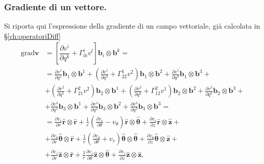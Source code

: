 \subsubsection{Gradiente di un vettore.}
Si riporta qui l'espressione della gradiente di un campo vettoriale, già calcolata in \S\ref{ch:operatoriDiff}
\begin{equation}
\begin{aligned}
    \text{grad} \bm{v} & = \left[ \dfrac{\partial v^i}{\partial q^k} + \Gamma_{lk}^i v^l \right] \bm{b}_i \otimes \bm{b}^k = \\
     & = \frac{\partial v^1}{\partial q^1}                                   \bm{b}_1 \otimes \bm{b}^1   + 
        \left( \frac{\partial v^1}{\partial q^2} + \Gamma_{22}^1 v^2 \right) \bm{b}_1 \otimes \bm{b}^2   + 
        \frac{\partial v^1}{\partial q^3}                                    \bm{b}_1 \otimes \bm{b}^3   + \\
     & + \left( \frac{\partial v^2}{\partial q^1} + \Gamma_{21}^2 v^2 \right)\bm{b}_2 \otimes \bm{b}^1   + 
        \left( \frac{\partial v^2}{\partial q^2} + \Gamma_{12}^2 v^1 \right) \bm{b}_2 \otimes \bm{b}^2   + 
        \frac{\partial v^2}{\partial q^3}                                    \bm{b}_2 \otimes \bm{b}^3   + \\
     & + \frac{\partial v^3}{\partial q^1}                                   \bm{b}_3 \otimes \bm{b}^1   + 
        \frac{\partial v^3}{\partial q^2}                                    \bm{b}_3 \otimes \bm{b}^2   + 
        \frac{\partial v^3}{\partial q^3}                                    \bm{b}_3 \otimes \bm{b}^3   = \\
     & = \frac{\partial v_r}{\partial r}                                     \bm{\hat{r}} \otimes \bm{\hat{r}}   + 
        \frac{1}{r}\left( \frac{\partial v_r}{\partial \theta} - v_\theta \right) \bm{\hat{r}} \otimes \bm{\hat{\theta}}  + 
        \frac{\partial v_r}{\partial z}                                     \bm{\hat{r}} \otimes \bm{\hat{z}}  + \\
     & +  \frac{\partial v_\theta}{\partial r}                              \bm{\hat{\theta}} \otimes \bm{\hat{r}}  + 
        \frac{1}{r}\left( \frac{\partial v_\theta}{\partial \theta} +  v_r \right) \bm{\hat{\theta}} \otimes \bm{\hat{\theta}}  + 
        \frac{\partial v_\theta}{\partial z}                                \bm{\hat{\theta}} \otimes \bm{\hat{z}}  + \\
     & + \frac{\partial v_z}{\partial r}                                    \bm{\hat{z}} \otimes \bm{\hat{r}} + 
        \frac{1}{r}\frac{\partial v_z}{\partial \theta}                     \bm{\hat{z}} \otimes \bm{\hat{\theta}}  + 
        \frac{\partial v_z}{\partial z}                                     \bm{\hat{z}} \otimes \bm{\hat{z}}  ,
\end{aligned}
\end{equation}
 

